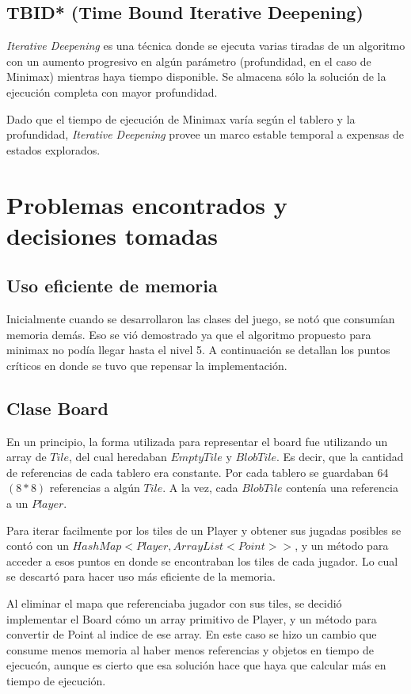 \documentclass[10pt,a4paper,notitlepage]{article}
\begin{document}
\subsection{TBID* (Time Bound Iterative Deepening)}

\textit{Iterative Deepening} es una técnica donde se ejecuta varias tiradas de un algoritmo con un aumento progresivo en algún parámetro (profundidad, en el caso de Minimax) mientras haya tiempo disponible. Se almacena sólo la solución de la ejecución completa con mayor profundidad.

Dado que el tiempo de ejecución de Minimax varía según el tablero y la profundidad, \textit{Iterative Deepening} provee un marco estable temporal a expensas de estados explorados.

\section{Problemas encontrados y decisiones tomadas}
\subsection{Uso eficiente de memoria}
  Inicialmente cuando se desarrollaron las clases del juego, se notó que consumían memoria demás.
  Eso se vió demostrado ya que el algoritmo propuesto para minimax no podía llegar hasta el nivel 5.
  A continuación se detallan los puntos críticos en donde se tuvo que repensar la implementación.

  \subsection{Clase Board}
    En un principio, la forma utilizada para representar el board fue utilizando un array de $Tile$, del cual heredaban $EmptyTile$ y $BlobTile$.
    Es decir, que la cantidad de referencias de cada tablero era constante.
    Por cada tablero se guardaban 64 $(8 * 8)$ referencias a algún $Tile$.  A la vez, cada $BlobTile$ contenía una referencia a un $Player$.

    Para iterar facilmente por los tiles de un Player y obtener sus jugadas posibles se contó con un $HashMap<Player, ArrayList<Point>>$, y un método para acceder a esos  puntos en donde se encontraban los tiles de cada jugador. Lo cual se descartó para hacer uso más eficiente de la memoria.

    Al eliminar el mapa que referenciaba jugador con sus tiles, se decidió implementar el Board cómo un array primitivo de Player, y un método para convertir de Point al indice de ese array.
    En este caso se hizo un cambio que consume menos memoria al haber menos referencias y objetos en tiempo de ejecucón, aunque es cierto que esa solución hace que haya que calcular más en tiempo de ejecución.
\end{document}
